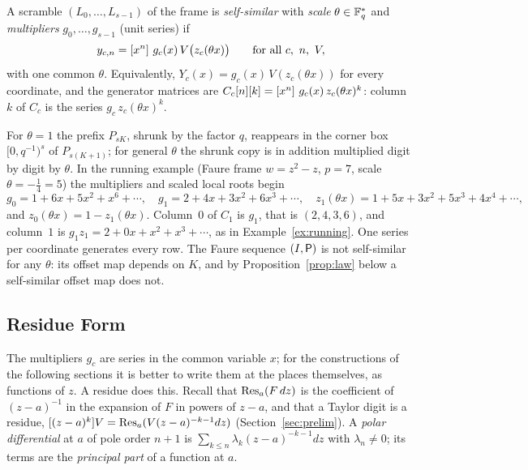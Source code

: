 \begin{definition}\label{def:selfsim}
A scramble $(L_0,\dots,L_{s-1})$ of the frame is \emph{self-similar} with \emph{scale} $\theta\in\mathbb{F}_q^*$ and \emph{multipliers} $g_0,\dots,g_{s-1}$ (unit series) if
\[
y_{c,n}=[x^{n}]\,\,g_c(x)\,V\bigl(z_c(\theta x)\bigr)\qquad\text{for all }c,\ n,\ V,
\]
with one common $\theta$. Equivalently, $Y_c(x)=g_c(x)\,V(z_c(\theta x))$ for every coordinate, and the generator matrices are $C_c[n][k]=[x^{n}]\,\,g_c(x)\,z_c(\theta x)^k$: column $k$ of $C_c$ is the series $g_c\,z_c(\theta x)^k$.
\end{definition}

For $\theta=1$ the prefix $P_{sK}$, shrunk by the factor $q$, reappears in the corner box $[0,q^{-1})^s$ of $P_{s(K+1)}$; for general $\theta$ the shrunk copy is in addition multiplied digit by digit by $\theta$. In the running example (Faure frame $w=z^2-z$, $p=7$, scale $\theta=-\frac14=5$) the multipliers and scaled local roots begin
\[
g_0=1+6x+5x^2+x^6+\cdots,\quad g_1=2+4x+3x^2+6x^3+\cdots,\quad z_1(\theta x)=1+5x+3x^2+5x^3+4x^4+\cdots,
\]
and $z_0(\theta x)=1-z_1(\theta x)$. Column~$0$ of $C_1$ is $g_1$, that is $(2,4,3,6)$, and column~$1$ is $g_1z_1=2+0x+x^2+x^3+\cdots$, as in Example~\ref{ex:running}. One series per coordinate generates every row. The Faure sequence $(I,\mathsf{P})$ is not self-similar for any $\theta$: its offset map depends on $K$, and by Proposition~\ref{prop:law} below a self-similar offset map does not.

\subsection{Residue Form}
The multipliers $g_c$ are series in the common variable $x$; for the constructions of the following sections it is better to write them at the places themselves, as functions of $z$. A residue does this. Recall that $\operatorname{Res}_a(F\,dz)$ is the coefficient of $(z-a)^{-1}$ in the expansion of $F$ in powers of $z-a$, and that a Taylor digit is a residue, $[(z-a)^k]V=\operatorname{Res}_a(V(z-a)^{-k-1}dz)$ (Section~\ref{sec:prelim}). A \emph{polar differential} at $a$ of pole order $n+1$ is $\sum_{k\le n}\lambda_k(z-a)^{-k-1}dz$ with $\lambda_n\ne0$; its terms are the \emph{principal part} of a function at $a$.


